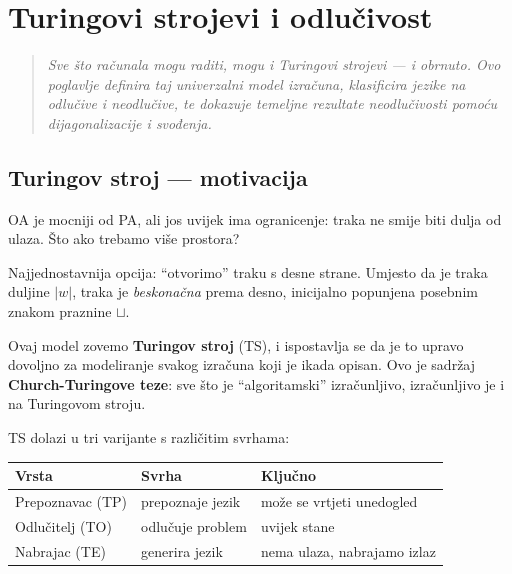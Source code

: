 \chapter{Turingovi strojevi i odlučivost}
\label{chap:8}

\begin{quote}
\itshape
Sve što računala mogu raditi, mogu i Turingovi strojevi --- i obrnuto.
Ovo poglavlje definira taj univerzalni model izračuna, klasificira jezike
na odlučive i neodlučive, te dokazuje temeljne rezultate neodlučivosti
pomoću dijagonalizacije i svođenja.
\end{quote}


\section{Turingov stroj --- motivacija}

OA je mocniji od PA, ali jos uvijek ima ogranicenje: traka ne smije
biti dulja od ulaza. Što ako trebamo više prostora?

Najjednostavnija opcija: ``otvorimo'' traku s desne strane. Umjesto
da je traka duljine $|w|$, traka je \emph{beskonačna} prema desno,
inicijalno popunjena posebnim znakom praznine $\sqcup$.

Ovaj model zovemo \textbf{Turingov stroj} (TS), i ispostavlja se da je
to upravo dovoljno za modeliranje svakog izračuna koji je ikada
opisan. Ovo je sadržaj \textbf{Church-Turingove teze}: sve što je
``algoritamski'' izračunljivo, izračunljivo je i na Turingovom stroju.

TS dolazi u tri varijante s različitim svrhama:

\begin{center}
\renewcommand{\arraystretch}{1.4}
\begin{tabular}{lll}
\hline
\textbf{Vrsta} & \textbf{Svrha} & \textbf{Ključno} \\
\hline
Prepoznavac (TP) & prepoznaje jezik & može se vrtjeti unedogled \\
Odlučitelj (TO) & odlučuje problem & uvijek stane \\
Nabrajac (TE) & generira jezik & nema ulaza, nabrajamo izlaz \\
\hline
\end{tabular}
\end{center}

